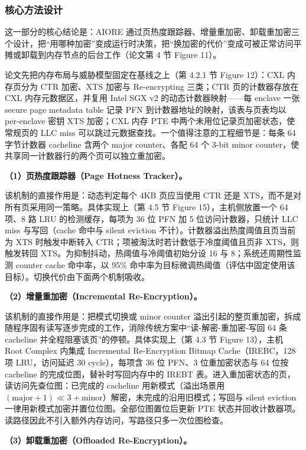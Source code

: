 \documentclass[11pt]{ctexart}
\begin{document}
\subsubsection{核心方法设计}
这一部分的核心结论是：AIORE 通过页热度跟踪器、增量重加密、卸载重加密三个设计，把“用哪种加密”变成运行时决策，把“换加密的代价”变成可被正常访问平摊或卸载到内存节点的后台工作（论文第 4 节 Figure 11）。\par
论文先把内存布局与威胁模型固定在基线之上（第 4.2.1 节 Figure 12）：CXL 内存页分为 CTR 加密、XTS 加密与 Re-encrypting 三类；CTR 页的计数器存放在 CXL 内存元数据区，并复用 Intel SGX v2 的动态计数器映射——每 enclave 一张 secure page metadata table 记录 PFN 到计数器地址的映射，该表与页表均以 per-enclave 密钥 XTS 加密；CXL 内存 PTE 中两个未用位记录页加密状态，使常规页的 LLC miss 可以跳过元数据查找。一个值得注意的工程细节是：每条 64 字节计数器 cacheline 含两个 major counter、各配 64 个 3-bit minor counter，使共享同一计数器行的两个页可以独立重加密。\par
\noindent\textbf{（1）页热度跟踪器（Page Hotness Tracker）。}\par
该机制的直接作用是：动态判定每个 4KB 页应当使用 CTR 还是 XTS，而不是对所有页采用同一策略。具体实现上（第 4.5 节 Figure 15），主机侧放置一个 64 项、8 路 LRU 的检测缓存，每项为 36 位 PFN 加 5 位访问计数器，只统计 LLC miss 与写回（cache 命中与 silent eviction 不计）。计数器溢出热度阈值且页当前为 XTS 时触发中断转入 CTR；项被淘汰时若计数低于冷度阈值且页非 XTS，则触发转回 XTS。为抑制抖动，热阈值与冷阈值初始分设 16 与 8；系统还周期性监测 counter cache 命中率，以 95\% 命中率为目标微调热阈值（评估中固定使用该目标）。切换代价由下面两个机制吸收。\par
\noindent\textbf{（2）增量重加密（Incremental Re-Encryption）。}\par
该机制的直接作用是：把模式切换或 minor counter 溢出引起的整页重加密，拆成随程序固有读写逐步完成的工作，消除传统方案中“读-解密-重加密-写回 64 条 cacheline 并全程阻塞该页”的停顿。具体实现上（第 4.3 节 Figure 13），主机 Root Complex 内集成 Incremental Re-Encryption Bitmap Cache（IREBC，128 项 LRU，访问延迟 30 cycle），每项含 36 位 PFN、3 位重加密状态与 64 位按 cacheline 的完成位图，替补时写回内存中的 IREBT 表。进入重加密状态的页，读访问先查位图：已完成的 cacheline 用新模式（溢出场景用 $(\text{major}+1)\ll3+\text{minor}$）解密，未完成的沿用旧模式；写回与 silent eviction 一律用新模式加密并置位位图。全部位图置位后更新 PTE 状态并回收计数器项。读路径因此不引入额外内存访问，写路径只多一次位图检查。\par
\noindent\textbf{（3）卸载重加密（Offloaded Re-Encryption）。}\par
\end{document}
